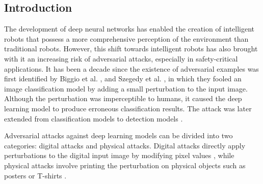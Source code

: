 


\subsection{Introduction}

The development of deep neural networks has enabled the creation of intelligent robots that possess a more comprehensive perception of the environment than traditional robots. However, this shift towards intelligent robots has also brought with it an increasing risk of adversarial attacks, especially in safety-critical applications.  It has been a decade since the existence of adversarial examples was first identified by Biggio et al. \citep{biggio2013evasion}, and Szegedy et al. \citep{szegedy2013intriguing}, in which they fooled an image classification model by adding a small perturbation to the input image.  Although the perturbation was imperceptible to humans, it caused the deep learning model to produce erroneous classification results. The attack was later extended from classification models to detection models \citep{han2023detection, LuSFF17}. 


Adversarial attacks against deep learning models can be divided into two categories: digital attacks and physical attacks. Digital attacks directly apply perturbations to the digital input image by modifying pixel values \citep{han2023driving}, while physical attacks involve printing the perturbation on physical objects such as posters \citep{lee2019physical} or T-shirts \citep{xu2020adversarial}.

